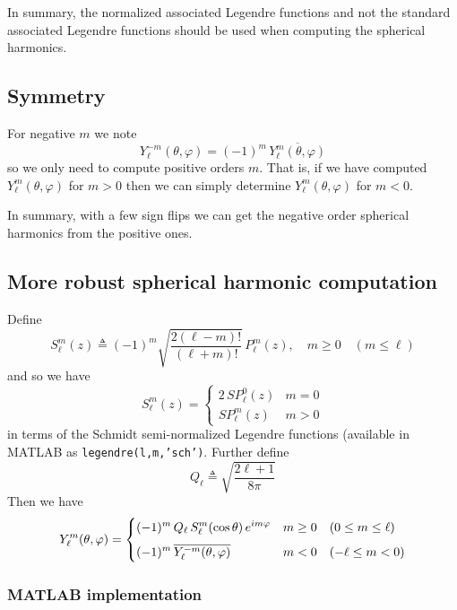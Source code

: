 \documentclass[a4paper,10pt]{article}
\newcommand{\dfn}{\triangleq}
\begin{document}
In summary, the normalized associated Legendre functions and not the standard associated Legendre functions should be used when computing the spherical harmonics.

\subsection{Symmetry}

For negative $m$ we note
\[
	Y_{\ell}^{-m}(\theta,\varphi)=(-1)^{m}\,\overline{Y_{\ell}^{m}(\theta,\varphi)}
\]
so we only need to compute positive orders $m$.  That is, if we have computed $Y_{\ell}^{m}(\theta,\varphi)$ for $m>0$ then we can simply determine $Y_{\ell}^{m}(\theta,\varphi)$ for $m<0$.

In summary, with a few sign flips we can get the negative order spherical harmonics from the positive ones.

\subsection{More robust spherical harmonic computation}

Define
\[
	S_{\ell}^{m}(z)\dfn(-1)^{m}\sqrt{\frac{2(\ell-m)!}{(\ell+m)!}}\,
		P_{\ell}^{m}(z),\quad m\geq0\quad (m\leq\ell)
\]
and so we have
\begin{equation}
\label{eqn:sps}
	S_{\ell}^{m}(z)=
		\begin{cases}
			2\,S\!P_{\ell}^{0}(z) &m=0 \\[2mm]
			S\!P_{\ell}^{m}(z) &m>0
		\end{cases}
\end{equation}
in terms of the Schmidt semi-normalized Legendre functions (available in MATLAB as {\tt\color{blue}legendre(l,m,'sch')}. Further define
\[
	Q_{\ell}\dfn\sqrt{\frac{2\ell+1}{8\pi}}
\]
Then we have
\[
	Y_{\ell}^{m}(\theta,\varphi)=
		\begin{cases}
			\displaystyle
			(-1)^{m}\,Q_{\ell}\,
			S_{\ell}^{m}(\cos\theta)\,e^{im\varphi} &m\geq0\quad (0\leq m\leq\ell) \\[2mm]
			\displaystyle
			(-1)^{m}\,\overline{Y_{\ell}^{\smash{-m}}(\theta,\varphi)} &m<0\quad (-\ell\leq m<0)
		\end{cases}
\]

\subsubsection{MATLAB implementation}
\end{document}
